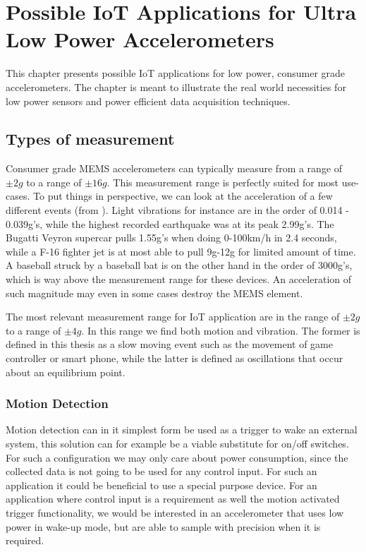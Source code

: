 \chapter{Possible IoT Applications for Ultra Low Power Accelerometers}

This chapter presents possible IoT applications for low power, consumer grade accelerometers. The chapter is meant to illustrate the real world necessities for low power sensors and power efficient data acquisition techniques.

\section{Types of measurement}

Consumer grade MEMS accelerometers can typically measure from a range of $\pm2g$ to a range of $\pm16g$. This measurement range is perfectly suited for most use-cases. To put things in perspective, we can look at the acceleration of a few different events (from \cite{g-force}). Light vibrations for instance are in the order of 0.014 - 0.039g's, while the highest recorded earthquake was at its peak 2.99g's. The Bugatti Veyron supercar pulls 1.55g's when doing 0-100km/h in 2.4 seconds, while a F-16 fighter jet is at most able to pull 9g-12g for limited amount of time. A baseball struck by a baseball bat is on the other hand in the order of 3000g's, which is way above the measurement range for these devices. An acceleration of such magnitude may even in some cases destroy the MEMS element. 

The most relevant measurement range for IoT application are in the range of $\pm2g$ to a range of $\pm4g$. In this range we find both motion and vibration. The former is defined in this thesis as a slow moving event such as the movement of game controller or smart phone, while the latter is defined as oscillations that occur about an equilibrium point.

\subsection{Motion Detection}

Motion detection can in it simplest form be used as a trigger to wake an external system, this solution can for example be a viable substitute for on/off switches. For such a configuration we may only care about power consumption, since the collected data is not going to be used for any control input. For such an application it could be beneficial to use a special purpose device. For an application where control input is a requirement as well the motion activated trigger functionality, we would be interested in an accelerometer that uses low power in wake-up mode, but are able to sample with precision when it is required.

